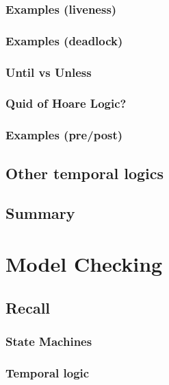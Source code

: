 \documentclass[12pt, a4paper]{book}
\begin{document}
  \subsubsection{Examples (liveness)}
  \label{subs:Examples (liveness)}
  \subsubsection{Examples (deadlock)}
  \label{subs:Examples (deadlock)}
  \subsubsection{Until vs Unless}
  \label{subs:Until vs Unless}
  \subsubsection{Quid of Hoare Logic?}
  \label{subs:Quid of Hoare Logic?}
  \subsubsection{Examples (pre/post)}
  \label{subs:Examples (pre/post)}
  \subsection{Other temporal logics}
  \label{sub:Other temporal logics}
  \subsection{Summary}
  \label{sub:Summary}






  \section{Model Checking}
  \label{sec:Model Checking}
  \subsection{Recall}
  \label{sub:Recall}
  \subsubsection{State Machines}
  \label{subs:State Machines}
  \subsubsection{Temporal logic}
  \label{subs:Temporal logic}
\end{document}
